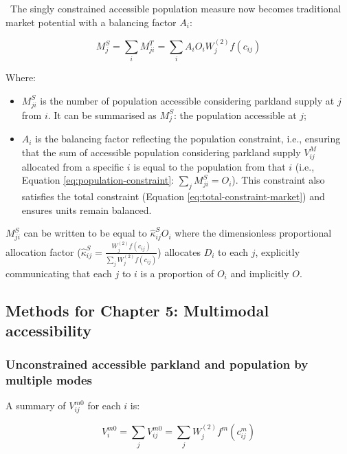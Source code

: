 \documentclass[
11pt, %
oneside, %
english, %
singlespacing, %
]{macthesis} %
\def\tightlist{}
\begin{document}
~The singly constrained accessible population measure now becomes traditional market potential with a balancing factor \(A_i\):

\begin{equation}
\label{eq:population-constrained-accessibility-park}
M^S_j = \sum_i M^T_{ji} = \sum_i A_i O_i W_j^{(2)} f(c_{ij})
\end{equation} 

Where:

\begin{itemize}
\tightlist
\item
  \(M^S_{ji}\) is the number of population accessible considering parkland supply at \(j\) from \(i\). It can be summarised as \(M^S_{j}\): the population accessible at \(j\);
\item
  \(A_i\) is the balancing factor reflecting the population constraint, i.e., ensuring that the sum of accessible population considering parkland supply \(V^M_{ij}\) allocated from a specific \(i\) is equal to the population from that \(i\) (i.e., Equation \ref{eq:population-constraint}: \(\sum_j M^S_{ji} =  O_i\)). This constraint also satisfies the total constraint (Equation \ref{eq:total-constraint-market}) and ensures units remain balanced.
\end{itemize}

\(M_{ji}^S\) can be written to be equal to \(\hat \kappa_{ij}^S O_i\) where the dimensionless proportional allocation factor (\(\hat \kappa_{ij}^S = \frac{W_j^{(2)} f(c_{ij})}{\sum_j W_j^{(2)} f(c_{ij})}\)) allocates \(D_i\) to each \(j\), explicitly communicating that each \(j\) to \(i\) is a proportion of \(O_i\) and implicitly \(O\).

\subsection{Methods for Chapter 5: Multimodal accessibility}\label{methods-for-chapter-5-multimodal-accessibility}

\subsubsection{Unconstrained accessible parkland and population by multiple modes}\label{unconstrained-accessible-parkland-and-population-by-multiple-modes}

A summary of \(V_{ij}^{m0}\) for each \(i\) is:

\begin{equation}
\label{eq:unconstrained-multimodal-accessibility-park}
V^{m0}_{i} = \sum_j V^{m0}_{ij} = \sum_j W_j^{(2)} f^m(c^m_{ij})
\end{equation} 
\end{document}
